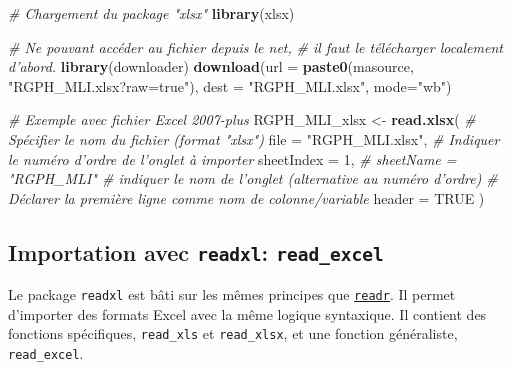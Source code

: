 \documentclass[]{book}
\newenvironment{Shaded}{\begin{snugshade}}{\end{snugshade}}
\newcommand{\KeywordTok}[1]{\textcolor[rgb]{0.13,0.29,0.53}{\textbf{#1}}}
\newcommand{\DataTypeTok}[1]{\textcolor[rgb]{0.13,0.29,0.53}{#1}}
\newcommand{\DecValTok}[1]{\textcolor[rgb]{0.00,0.00,0.81}{#1}}
\newcommand{\StringTok}[1]{\textcolor[rgb]{0.31,0.60,0.02}{#1}}
\newcommand{\CommentTok}[1]{\textcolor[rgb]{0.56,0.35,0.01}{\textit{#1}}}
\newcommand{\OtherTok}[1]{\textcolor[rgb]{0.56,0.35,0.01}{#1}}
\newcommand{\NormalTok}[1]{#1}
\begin{document}
\begin{Shaded}
\begin{Highlighting}[]
\CommentTok{# Chargement du package "xlsx"}
\KeywordTok{library}\NormalTok{(xlsx)}

\CommentTok{# Ne pouvant accéder au fichier depuis le net,}
\CommentTok{# il faut le télécharger localement d'abord.}
\KeywordTok{library}\NormalTok{(downloader)}
\KeywordTok{download}\NormalTok{(}\DataTypeTok{url =} \KeywordTok{paste0}\NormalTok{(masource, }\StringTok{"RGPH_MLI.xlsx?raw=true"}\NormalTok{), }
         \DataTypeTok{dest =} \StringTok{"RGPH_MLI.xlsx"}\NormalTok{, }
         \DataTypeTok{mode=}\StringTok{"wb"}\NormalTok{)}

\CommentTok{# Exemple avec fichier Excel 2007-plus}
\NormalTok{RGPH_MLI_xlsx <-}\StringTok{ }\KeywordTok{read.xlsx}\NormalTok{( }
  \CommentTok{# Spécifier le nom du fichier  (format "xlsx")}
  \DataTypeTok{file =} \StringTok{"RGPH_MLI.xlsx"}\NormalTok{, }
  \CommentTok{# Indiquer le numéro d'ordre de l'onglet à importer}
  \DataTypeTok{sheetIndex =} \DecValTok{1}\NormalTok{, }
  \CommentTok{#  sheetName = "RGPH_MLI" # indiquer le nom de l'onglet (alternative au numéro d'ordre)}
  \CommentTok{# Déclarer la première ligne comme nom de colonne/variable}
  \DataTypeTok{header =} \OtherTok{TRUE}
\NormalTok{)}
\end{Highlighting}
\end{Shaded}

\subsection{\texorpdfstring{Importation avec \texttt{readxl}:
\texttt{read\_excel}}{Importation avec readxl: read\_excel}}\label{importation-avec-readxl-read_excel}

Le package \texttt{readxl} est bâti sur les mêmes principes que
\href{https://www.tidyverse.org/}{\texttt{readr}}. Il permet d'importer
des formats Excel avec la même logique syntaxique. Il contient des
fonctions spécifiques, \texttt{read\_xls} et \texttt{read\_xlsx}, et une
fonction généraliste, \texttt{read\_excel}.
\end{document}
